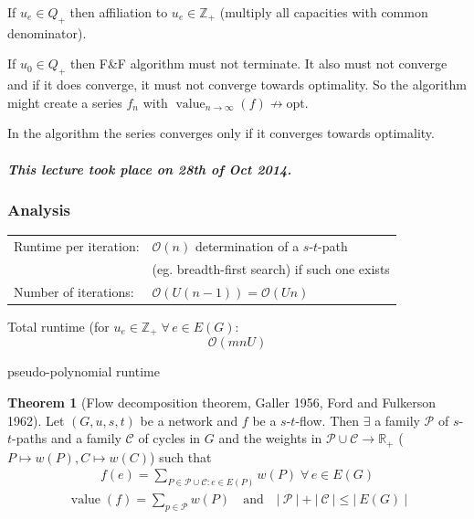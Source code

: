 \documentclass[a4paper]{article}
\theoremstyle{definition}
\newtheorem{theorem}{Theorem}
\newcommand{\card}[1]{\left|\:\!#1\:\!\right|}
\newcommand{\dateref}[1]{\paragraph{\textit{This lecture took place on #1.}}}
\newcommand{\gath}[2]{$#1$-$#2$-path} %
\newcommand{\flow}[2]{$#1$-$#2$-flow}
\newcommand{\fall}{\;\forall\,}
\begin{document}
If $u_e \in Q_+$ then affiliation to $u_e \in \mathbb{Z}_+$ (multiply all capacities with common denominator).

If $u_0 \in Q_+$ then F\&F algorithm must not terminate. It also must not converge and if it does converge, it must not converge towards optimality. So the algorithm might create a series $f_n$ with $\operatorname{value}_{n\rightarrow\infty}(f) \nrightarrow \text{opt}$.

In the algorithm the series converges only if it converges towards optimality.

\dateref{28th of Oct 2014}

\subsubsection{Analysis}
%
\begin{center}
  \begin{tabular}{ll}
    Runtime per iteration:  & $\mathcal{O}(n)$ determination of a \gath st \\
                            & (eg. breadth-first search) if such one exists \\
    Number of iterations:   & $\mathcal{O}(U(n-1)) = \mathcal{O}(Un)$
  \end{tabular}
\end{center}

Total runtime (for $u_e \in \mathbb{Z}_+ \fall e \in E(G):$
\[
  \mathcal{O}(mnU)
\]
\begin{center}
  pseudo-polynomial runtime
\end{center}

\begin{theorem}[Flow decomposition theorem, Galler 1956, Ford and Fulkerson 1962]
  \label{satz-4.5}
  Let $(G, u, s, t)$ be a network and $f$ be a \flow st. Then $\exists$ a family
  $\mathcal{P}$ of \gath sts and a family $\mathcal{C}$ of cycles in $G$ and the
  weights in $\mathcal{P} \cup \mathcal{C} \rightarrow \mathbb{R}_+$
  ($P \mapsto w(P), C \mapsto w(C)$) such that
  \begin{align*}
    f(e) = \sum_{P \in \mathcal{P} \cup \mathcal{C}: e \in E(P)} w(P) \fall e \in E(G)
  \end{align*}
  \begin{align*}
    \operatorname{value}(f) = \sum_{p \in \mathcal{P}} w(P)
      \quad\text{and}\quad
      \card{\mathcal{P}} + \card{\mathcal{C}} \leq \card{E(G)}
  \end{align*}
\end{theorem}
\end{document}
